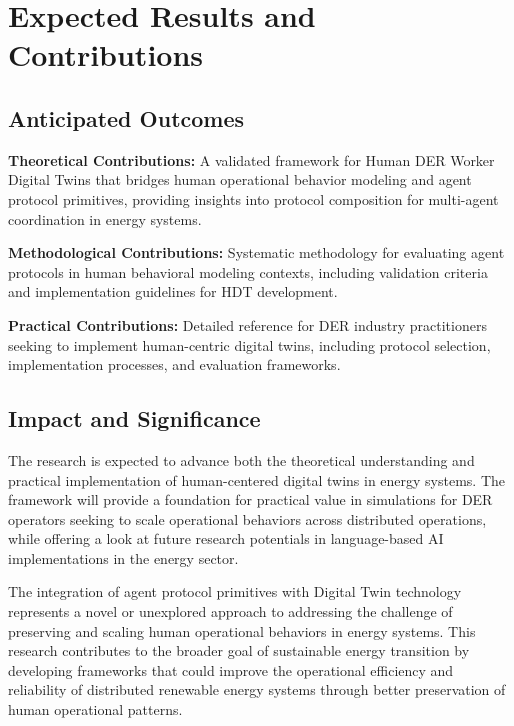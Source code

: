 \documentclass[12pt,a4paper]{article}
\begin{document}
\section{Expected Results and Contributions}
\label{sec:results}

\subsection{Anticipated Outcomes}

\noindent \textbf{Theoretical Contributions:} A validated framework for Human DER Worker Digital Twins that bridges human operational behavior modeling and agent protocol primitives, providing insights into protocol composition for multi-agent coordination in energy systems.

\noindent \textbf{Methodological Contributions:} Systematic methodology for evaluating agent protocols in human behavioral modeling contexts, including validation criteria and implementation guidelines for HDT development.

\noindent \textbf{Practical Contributions:} Detailed reference for DER industry practitioners seeking to implement human-centric digital twins, including protocol selection, implementation processes, and evaluation frameworks.

\subsection{Impact and Significance}

The research is expected to advance both the theoretical understanding and practical implementation of human-centered digital twins in energy systems. The framework will provide a foundation for practical value in simulations for DER operators seeking to scale operational behaviors across distributed operations, while offering a look at future research potentials in language-based AI implementations in the energy sector.

The integration of agent protocol primitives with Digital Twin technology represents a novel or unexplored approach to addressing the challenge of preserving and scaling human operational behaviors in energy systems. This research contributes to the broader goal of sustainable energy transition by developing frameworks that could improve the operational efficiency and reliability of distributed renewable energy systems through better preservation of human operational patterns.

\clearpage

\printbibliography
\end{document}
